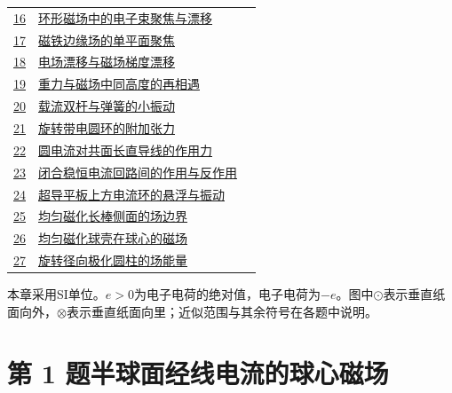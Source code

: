 \documentclass[UTF8,fontset=fandol,a4paper,11pt]{ctexart}
\begin{document}
\begin{longtable}{@{}r p{113mm} r@{}}
\hyperref[q:16]{16} & \hyperref[q:16]{环形磁场中的电子束聚焦与漂移} & \pageref{q:16} \\

\hyperref[q:17]{17} & \hyperref[q:17]{磁铁边缘场的单平面聚焦} & \pageref{q:17} \\

\hyperref[q:18]{18} & \hyperref[q:18]{电场漂移与磁场梯度漂移} & \pageref{q:18} \\

\hyperref[q:19]{19} & \hyperref[q:19]{重力与磁场中同高度的再相遇} & \pageref{q:19} \\

\hyperref[q:20]{20} & \hyperref[q:20]{载流双杆与弹簧的小振动} & \pageref{q:20} \\

\hyperref[q:21]{21} & \hyperref[q:21]{旋转带电圆环的附加张力} & \pageref{q:21} \\

\hyperref[q:22]{22} & \hyperref[q:22]{圆电流对共面长直导线的作用力} & \pageref{q:22} \\

\hyperref[q:23]{23} & \hyperref[q:23]{闭合稳恒电流回路间的作用与反作用} & \pageref{q:23} \\

\hyperref[q:24]{24} & \hyperref[q:24]{超导平板上方电流环的悬浮与振动} & \pageref{q:24} \\

\hyperref[q:25]{25} & \hyperref[q:25]{均匀磁化长棒侧面的场边界} & \pageref{q:25} \\

\hyperref[q:26]{26} & \hyperref[q:26]{均匀磁化球壳在球心的磁场} & \pageref{q:26} \\

\hyperref[q:27]{27} & \hyperref[q:27]{旋转径向极化圆柱的场能量} & \pageref{q:27} \\

\bottomrule\end{longtable}

\noindent 本章采用SI单位。$e>0$为电子电荷的绝对值，电子电荷为$-e$。图中$\odot$表示垂直纸面向外，$\otimes$表示垂直纸面向里；近似范围与其余符号在各题中说明。

\clearpage


\section*{第 1 题\quad 半球面经线电流的球心磁场}\label{q:1}
\end{document}

